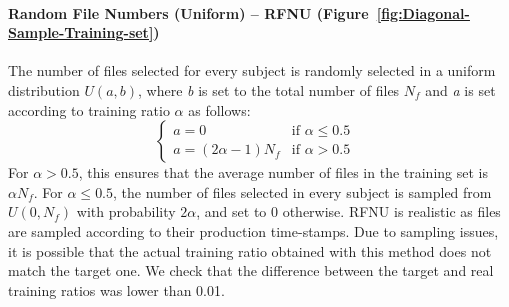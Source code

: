 \documentclass[10pt, conference, compsocconf]{IEEEtran}
\begin{document}
\paragraph{Random File Numbers (Uniform) -- RFNU (Figure~\ref{fig:Diagonal-Sample-Training-set})}
The number of files selected for every subject is randomly selected in
a uniform distribution $U(\textit{a},\textit{b})$, where \textit{b} is set to the total
number of files $N_{f}$ and \textit{a} is set according to training ratio $\alpha$ as follows:
\[
  \begin{cases}
          \textit{a} = 0      & \text{if $\alpha \leq 0.5$ }\\
          
          \textit{a} = (2\alpha - 1) N_{f} & \text{if $\alpha > 0.5$}
  \end{cases}
\]
 For $\alpha > 0.5$, this ensures that the average number of files in 
 the training set is $\alpha N_f$. For $\alpha \leq 0.5$, the number of 
 files selected in every subject is sampled from $U(0,N_f)$ with 
 probability $2\alpha$, and set to 0 otherwise.
RFNU is realistic as files are sampled according to their production time-stamps.
Due to sampling issues, it is possible that the actual training ratio obtained with this method
does not match the target one. We check that the difference between the target and real training ratios
was lower than 0.01.\\ 
\end{document}
